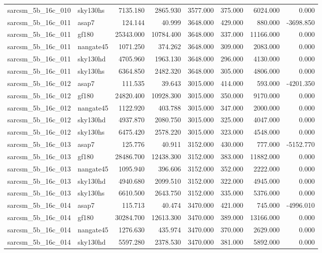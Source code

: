 \begin{tabular}{llrrrrrr}
sarcsm\_5b\_16c\_010 & sky130hs & 7135.180 & 2865.930 & 3577.000 & 375.000 & 6024.000 & 0.000 \\
sarcsm\_5b\_16c\_011 & asap7 & 124.144 & 40.999 & 3648.000 & 429.000 & 880.000 & -3698.850 \\
sarcsm\_5b\_16c\_011 & gf180 & 25343.000 & 10784.400 & 3648.000 & 337.000 & 11166.000 & 0.000 \\
sarcsm\_5b\_16c\_011 & nangate45 & 1071.250 & 374.262 & 3648.000 & 309.000 & 2083.000 & 0.000 \\
sarcsm\_5b\_16c\_011 & sky130hd & 4705.960 & 1963.130 & 3648.000 & 296.000 & 4130.000 & 0.000 \\
sarcsm\_5b\_16c\_011 & sky130hs & 6364.850 & 2482.320 & 3648.000 & 305.000 & 4806.000 & 0.000 \\
sarcsm\_5b\_16c\_012 & asap7 & 111.535 & 39.643 & 3015.000 & 414.000 & 593.000 & -4201.350 \\
sarcsm\_5b\_16c\_012 & gf180 & 24820.400 & 10928.300 & 3015.000 & 350.000 & 9170.000 & 0.000 \\
sarcsm\_5b\_16c\_012 & nangate45 & 1122.920 & 403.788 & 3015.000 & 347.000 & 2000.000 & 0.000 \\
sarcsm\_5b\_16c\_012 & sky130hd & 4937.870 & 2080.750 & 3015.000 & 325.000 & 4047.000 & 0.000 \\
sarcsm\_5b\_16c\_012 & sky130hs & 6475.420 & 2578.220 & 3015.000 & 323.000 & 4548.000 & 0.000 \\
sarcsm\_5b\_16c\_013 & asap7 & 125.776 & 40.911 & 3152.000 & 430.000 & 777.000 & -5152.770 \\
sarcsm\_5b\_16c\_013 & gf180 & 28486.700 & 12438.300 & 3152.000 & 383.000 & 11882.000 & 0.000 \\
sarcsm\_5b\_16c\_013 & nangate45 & 1095.940 & 396.606 & 3152.000 & 352.000 & 2222.000 & 0.000 \\
sarcsm\_5b\_16c\_013 & sky130hd & 4940.680 & 2099.510 & 3152.000 & 322.000 & 4945.000 & 0.000 \\
sarcsm\_5b\_16c\_013 & sky130hs & 6610.500 & 2643.750 & 3152.000 & 335.000 & 5376.000 & 0.000 \\
sarcsm\_5b\_16c\_014 & asap7 & 115.713 & 40.474 & 3470.000 & 421.000 & 745.000 & -4996.010 \\
sarcsm\_5b\_16c\_014 & gf180 & 30284.700 & 12613.300 & 3470.000 & 389.000 & 13166.000 & 0.000 \\
sarcsm\_5b\_16c\_014 & nangate45 & 1276.630 & 435.974 & 3470.000 & 370.000 & 2629.000 & 0.000 \\
sarcsm\_5b\_16c\_014 & sky130hd & 5597.280 & 2378.530 & 3470.000 & 381.000 & 5892.000 & 0.000 \\

\end{tabular}
